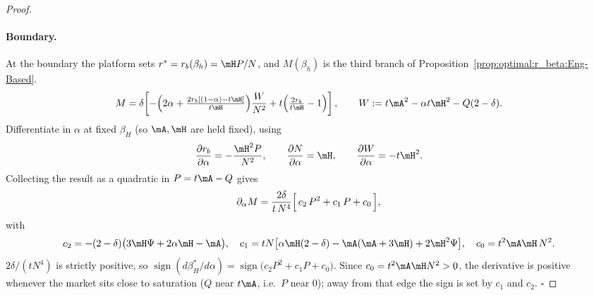 \begin{proof}
\paragraph{Boundary.}
At the boundary the platform sets $r^* = r_b(\beta_h) = \mH P/N$, and $M(\beta_h)$ is
the third branch of Proposition~\ref{prop:optimal:r_beta:Eng-Based}.
\[
    M = \delta\!\left[-\Bigl(2\alpha + \tfrac{2 r_b[(1-\alpha)-t\mH]}{t\mH}\Bigr)\frac{W}{N^2}
        + t\Bigl(\tfrac{2 r_b}{t\mH}-1\Bigr)\right],
    \qquad W := t\mA^2 - \alpha t\mH^2 - Q(2-\delta).
\]
Differentiate in $\alpha$ at fixed $\beta_H$ (so $\mA,\mH$ are held fixed), using
\[
    \frac{\partial r_b}{\partial\alpha} = -\frac{\mH^2 P}{N^2},\qquad
    \frac{\partial N}{\partial\alpha} = \mH,\qquad
    \frac{\partial W}{\partial\alpha} = -t\mH^2 .
\]
Collecting the result as a quadratic in $P = t\mA - Q$ gives
\begin{equation}\label{eq:dPhi-dalpha-E-bnd}
    \partial_\alpha M
    = \frac{2\delta}{t\,N^4}\Bigl[\,c_2\,P^2 + c_1\,P + c_0\,\Bigr],
\end{equation}
with
\[
    c_2 = -(2-\delta)\bigl(3\mH\Psi + 2\alpha\mH - \mA\bigr),\quad
    c_1 = tN\bigl[\alpha\mH(2-\delta) - \mA(\mA+3\mH) + 2\mH^2\Psi\bigr],\quad
    c_0 = t^2\mA\mH\,N^2 .
\]
$2\delta/(t N^4)$ is strictly positive, so
$\operatorname{sign}(d\beta_H^*/d\alpha) = \operatorname{sign}\!\bigl(c_2 P^2 + c_1 P + c_0\bigr)$.
Since $c_0 = t^2\mA\mH N^2 > 0$, the derivative is positive whenever the market sits close
to saturation ($Q$ near $t\mA$, i.e.\ $P$ near $0$); away from that edge the sign is set by
$c_1$ and $c_2$.
\hfill $\square$
\end{proof}




